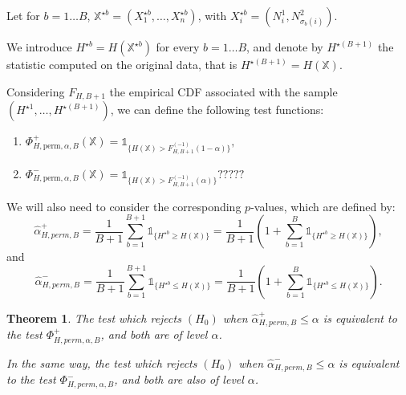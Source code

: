 \documentclass[a4paper,oneside,10pt]{article}
\newtheorem{thm}{Theorem}[subsection]
\newcommand{\pa}[1]{\ensuremath{\left( #1 \right)}}
\newcommand{\X}{\ensuremath{\mathds{X}}}
\newcommand{\1}[1]{\ensuremath{\mathds{1}_{\{ #1 \}}}}  %
\begin{document}
Let for $b=1\ldots B$, $\X^{\star b}=(X_1^{\star b},\ldots,X_n^{\star b})$, with $X_i^{\star b}=(N_i^1,N_{\sigma_b(i)}^2)$. 

We introduce $H^{\star b}=H(\X^{\star b})$ for every $b=1\ldots B$, and denote by $H^{\star (B+1)}$ the statistic computed on the original data, that is $H^{\star (B+1)}=H(\X)$.

Considering $F_{H,B+1}$ the empirical CDF associated with the sample $\pa{H^{\star 1},\ldots,H^{\star (B+1)}}$, we can define the following test functions:

\begin{enumerate}
\item $\Phi_{H,\textrm{perm},\alpha,B}^{+}(\X)=\1{H(\X)>F_{H,B+1}^{(-1)}(1-\alpha)},$
\item $\Phi_{H,\textrm{perm},\alpha,B}^{-}(\X)=\1{H(\X)>F_{H,B+1}^{(-1)}(\alpha)} ?????$
\end{enumerate}

We will also need to consider the corresponding $p$-values, which are defined by:
$$\hat{\alpha}^+_{H,perm,B}=\frac{1}{B+1}\sum_{b=1}^{B+1} \1{H^{\star b} \geq H(\X)}=\frac{1}{B+1}\pa{1+\sum_{b=1}^B \1{H^{\star b}\geq H(\X)}},$$
and 
$$\hat{\alpha}^-_{H,perm,B}=\frac{1}{B+1}\sum_{b=1}^{B+1} \1{H^{\star b}\leq H(\X)}=\frac{1}{B+1}\pa{1+\sum_{b=1}^B \1{H^{\star b}\leq H(\X)}}.$$

\begin{thm}
The test which rejects $(H_0)$ when $\hat{\alpha}^+_{H,perm,B}\leq \alpha$ is equivalent to the test $\Phi_{H,perm,\alpha,B}^+$, and both are of level $\alpha$.

In the same way, the test which rejects $(H_0)$ when $\hat{\alpha}^-_{H,perm,B}\leq \alpha$ is equivalent to the test $ \Phi_{H,perm,\alpha,B}^-$, and both are also of level $\alpha$.
\end{thm}
\end{document}
